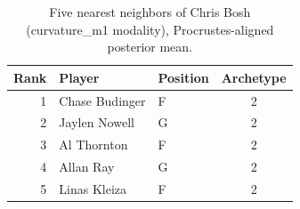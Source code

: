 \begin{table}[htbp]
  \centering\small
  \begin{tabular}{rllc}
    \toprule
    Rank & Player & Position & Archetype \\
    \midrule
    1 & Chase Budinger & F & 2 \\
    2 & Jaylen Nowell & G & 2 \\
    3 & Al Thornton & F & 2 \\
    4 & Allan Ray & G & 2 \\
    5 & Linas Kleiza & F & 2 \\
    \bottomrule
  \end{tabular}
  \caption{Five nearest neighbors of Chris Bosh (curvature_m1 modality), Procrustes-aligned posterior mean.}
  \label{tab:Chris_Bosh_neighbors_curvature_m1}
\end{table}

